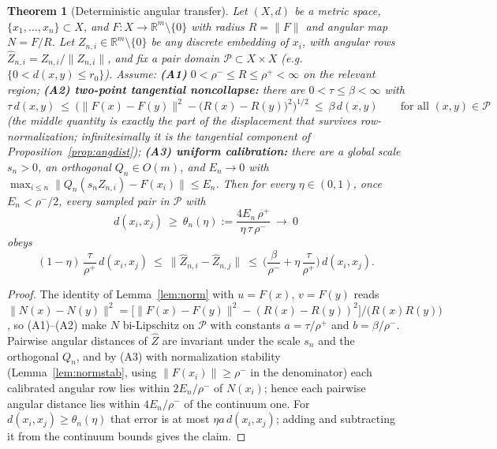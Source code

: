 \documentclass[11pt]{article}
\newtheorem{theorem}{Theorem}
\theoremstyle{remark}
\begin{document}
\begin{theorem}[Deterministic angular transfer]\label{thm:transfer}
Let $(X,d)$ be a metric space, $\{x_1,\dots,x_n\}\subset X$, and
$F:X\to\mathbb R^m\setminus\{0\}$ with radius $R=\lVert F\rVert$ and angular map
$N=F/R$. Let $Z_{n,i}\in\mathbb R^m\setminus\{0\}$ be \emph{any} discrete
embedding of $x_i$, with angular rows
$\hat Z_{n,i}=Z_{n,i}/\lVert Z_{n,i}\rVert$, and fix a pair domain
$\mathcal P\subset X\times X$ (e.g.\ $\{0<d(x,y)\le r_0\}$). Assume:
\textbf{(A1)} $0<\rho^-\le R\le\rho^+<\infty$ on the relevant region;
\textbf{(A2) two-point tangential noncollapse:} there are
$0<\tau\le\beta<\infty$ with
\[
\tau\,d(x,y)\ \le\
\Big(\lVert F(x)-F(y)\rVert^2-\big(R(x)-R(y)\big)^2\Big)^{1/2}
\ \le\ \beta\,d(x,y)
\qquad\text{for all }(x,y)\in\mathcal P
\]
(the middle quantity is exactly the part of the displacement that survives
row-normalization; infinitesimally it is the tangential component of
Proposition~\ref{prop:angdist});
\textbf{(A3) uniform calibration:} there are a global scale $s_n>0$, an
orthogonal $Q_n\in O(m)$, and $E_n\to0$ with
$\max_{i\le n}\lVert Q_n(s_nZ_{n,i})-F(x_i)\rVert\le E_n$.
Then for every $\eta\in(0,1)$, once $E_n<\rho^-/2$, every sampled pair in
$\mathcal P$ with
\[
d(x_i,x_j)\ \ge\ \theta_n(\eta):=\frac{4E_n\,\rho^+}{\eta\,\tau\,\rho^-}
\ \longrightarrow\ 0
\]
obeys
\[
(1-\eta)\,\frac{\tau}{\rho^+}\,d(x_i,x_j)
\ \le\ \lVert\hat Z_{n,i}-\hat Z_{n,j}\rVert
\ \le\ \Big(\frac{\beta}{\rho^-}+\eta\,\frac{\tau}{\rho^+}\Big)\,d(x_i,x_j).
\]
\end{theorem}

\begin{proof}
The identity of Lemma~\ref{lem:norm} with $u=F(x)$, $v=F(y)$ reads
$\lVert N(x)-N(y)\rVert^2=\big[\lVert F(x)-F(y)\rVert^2-(R(x)-R(y))^2\big]
/\big(R(x)R(y)\big)$, so (A1)--(A2) make $N$ bi-Lipschitz on $\mathcal P$ with
constants $a=\tau/\rho^+$ and $b=\beta/\rho^-$. Pairwise angular distances of
$\hat Z$ are invariant under the scale $s_n$ and the orthogonal $Q_n$, and by
(A3) with normalization stability (Lemma~\ref{lem:normstab}, using
$\lVert F(x_i)\rVert\ge\rho^-$ in the denominator) each calibrated angular row
lies within $2E_n/\rho^-$ of $N(x_i)$; hence each pairwise angular distance
lies within $4E_n/\rho^-$ of the continuum one. For
$d(x_i,x_j)\ge\theta_n(\eta)$ that error is at most $\eta a\,d(x_i,x_j)$;
adding and subtracting it from the continuum bounds gives the claim.
\end{proof}
\end{document}
